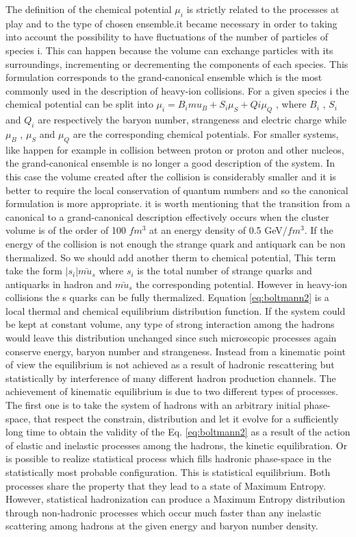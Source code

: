 \documentclass[12pt,a4paper]{book}
\begin{document}
	The definition of the chemical potential $\mu_i$ is strictly related to the processes at play and to the type of chosen ensemble.it became necessary in order to taking into account the possibility to have fluctuations of the number of particles of species i. This can happen because the volume can exchange particles with its surroundings, incrementing or decrementing the components of each species. This formulation corresponds to the grand-canonical ensemble which is the most commonly used in the description of heavy-ion collisions. For a given species i the chemical potential can be split into $\mu_i = B_i mu_B + S_i μ_S + Qi μ_Q$ , where $B_i$ , $S_i$ and $Q_i$ are respectively the baryon number, strangeness and electric charge while $μ_B$ , $μ_S$ and $μ_Q$ are the corresponding chemical potentials. For smaller systems, like happen for example in collision between proton or proton and other nucleos, the grand-canonical ensemble is no longer a good description of the system. In this case the volume created after the collision is considerably smaller and it is better to require the local conservation of quantum numbers and so the canonical formulation is more appropriate. it is worth mentioning that the transition from a canonical to a grand-canonical description effectively occurs when the cluster volume is of the order of 100 $fm^3$ at an
	energy density of 0.5 GeV/$fm^3$. If the energy of the collision is not enough the strange quark and antiquark can be non thermalized. So we should add another therm to chemical potential, This term take the form $|s_i| \bar{mu_s}$ where $s_i$ is the total number of	strange quarks and antiquarks in hadron and $\bar{mu_s}$ the corresponding potential. However in heavy-ion collisions the s quarks can be fully thermalized. Equation \ref{eq:boltmann2} is a local thermal and chemical equilibrium distribution function. If the system could	be kept at constant volume, any type of strong interaction among the hadrons would leave this distribution unchanged since such microscopic processes again conserve energy, baryon number and strangeness. Instead from a kinematic point of view the equilibrium is not achieved as a result of hadronic rescattering but statistically by interference of many different hadron production channels. The achievement of kinematic equilibrium is due to two different types of processes. The first one is to take the system of hadrons with an arbitrary initial phase-space, that respect the constrain, distribution and let it evolve for a sufficiently long time to obtain the validity of the Eq. \ref{eq:boltmann2} as a result of the action of	elastic and inelastic processes among the hadrons, the kinetic equilibration. Or is possible to realize	statistical process which fills hadronic phase-space in the statistically most probable configuration. This	is statistical equilibrium. Both processes share the property that they lead to a state of Maximum Entropy.
	However, statistical hadronization can produce a Maximum Entropy distribution through non-hadronic processes which occur much faster than any inelastic scattering among hadrons at the given energy and	baryon number density. %
	
\end{document}
